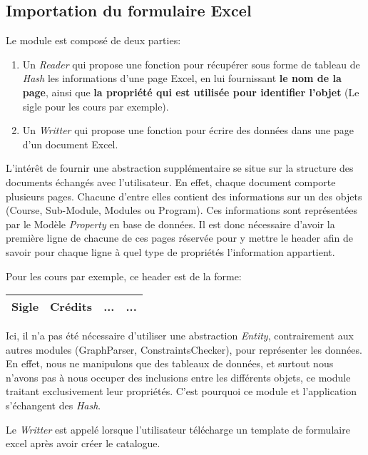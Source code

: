 \subsection{Importation du formulaire Excel}
Le module est composé de deux parties: 
\begin{enumerate}
\item Un \textit{Reader} qui propose une fonction pour récupérer sous forme de tableau de \textit{Hash} les informations d'une page Excel, en lui fournissant \textbf{le nom de la page}, ainsi que \textbf{la propriété qui est utilisée pour identifier l'objet} (Le sigle pour les cours par exemple).
\item Un \textit{Writter} qui propose une fonction pour écrire des données dans une page d'un document Excel.
\end{enumerate}

L'intérêt de fournir une abstraction supplémentaire se situe sur la structure des documents échangés avec l'utilisateur. En effet, chaque document comporte plusieurs pages. Chacune d'entre elles contient des informations sur un des objets (Course, Sub-Module, Modules ou Program). Ces informations sont représentées par le Modèle \textit{Property} en base de données. Il est donc nécessaire d'avoir la première ligne de chacune de ces pages réservée pour y mettre le header afin de savoir pour chaque ligne à quel type de propriétés l'information appartient.

Pour les cours par exemple, ce header est de la forme:
\begin{table}[H]
\centering
\begin{tabular}{| c | c | c | c |}
\hline
\textbf{Sigle} & \textbf{Crédits} & \textbf{...} & \textbf{...}\\
\hline
\end{tabular}  
\end{table}

Ici, il n'a pas été nécessaire d'utiliser une abstraction \textit{Entity}, contrairement aux autres modules (GraphParser, ConstraintsChecker), pour représenter les données. En effet, nous ne manipulons que des tableaux de données, et surtout nous n'avons pas à nous occuper des inclusions entre les différents objets, ce module traitant exclusivement leur propriétés. C'est pourquoi ce module et l'application s'échangent des \textit{Hash}. 


Le \textit{Writter} est appelé lorsque l'utilisateur télécharge un template de formulaire excel après avoir créer le catalogue. 

